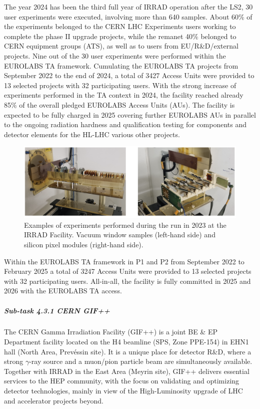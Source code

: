 The year 2024 has been the third full year of IRRAD operation after the LS2, 30 user experiments were executed, involving more than 640 samples. About 60\% of the experiments belonged to the CERN LHC Experiments users working to complete the phase II upgrade projects, while the remanet 40\% belonged to CERN equipment groups (ATS), as well as to users from EU/R\&D/external projects. Nine out of the 30 user experiments were performed within the EUROLABS TA framework. Cumulating the EUROLABS TA projects from September 2022 to the end of 2024, a total of 3427 Access Units were provided to 13 selected projects with 32 participating users. With the strong increase of experiments performed in the TA context in 2024, the facility reached already 85\% of the overall pledged EUROLABS Access Units (AUs). The facility is expected to be fully charged in 2025 covering further EUROLABS AUs in parallel to the ongoing radiation hardness and qualification testing for components and detector elements for the HL-LHC various other projects.

\begin{figure}[!h]
    \centering
    \includegraphics[width=1\linewidth]{image7.png}
    \caption{Examples of experiments performed during the run in 2023 at the IRRAD Facility. Vacuum window samples (left-hand side) and silicon pixel modules (right-hand side).
}
    \label{fig:4.3.1}
\end{figure}

Within the EUROLABS TA framework in P1 and P2 from September 2022 to February 2025 a total of 3247 Access Units were provided to 13 selected projects with 32 participating users. All-in-all, the facility is fully committed in 2025 and 2026 with the EUROLABS TA access. 

\subparagraph{Sub-task 4.3.1 CERN GIF++} \mbox{}
The CERN Gamma Irradiation Facility (GIF++) is a joint BE \& EP Department facility located on the H4 beamline (SPS, Zone PPE-154) in EHN1 hall (North Area, Prevéssin site). It is a unique place for detector R\&D, where a strong $\gamma$-ray source and a muon/pion particle beam 
are simultaneously available. Together with IRRAD in the East Area (Meyrin site), GIF++ delivers essential services to the HEP community, with the focus on validating and optimizing detector technologies, mainly in view of the High-Luminosity upgrade of LHC and accelerator projects beyond.

